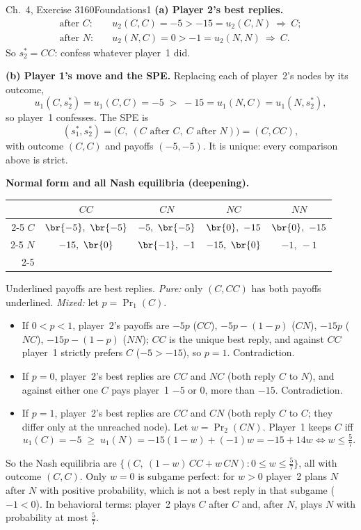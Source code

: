 \begin{exsol}{\MG{} Ch.~4, Exercise 3}{160}{Foundations}{1}
\textbf{(a) Player 2's best replies.}
\begin{align*}
  \text{after } C:&\quad u_2(C,C) = -5 > -15 = u_2(C,N) \ \Rightarrow\ C;\\
  \text{after } N:&\quad u_2(N,C) = 0 > -1 = u_2(N,N) \ \Rightarrow\ C .
\end{align*}
So $s_2^* = CC$: confess whatever player~1 did.

\textbf{(b) Player 1's move and the SPE.} Replacing each of player~2's nodes by its outcome,
\[
  u_1(C, s_2^*) = u_1(C,C) = -5 \;>\; -15 = u_1(N,C) = u_1(N, s_2^*),
\]
so player~1 confesses. The SPE is
\[
  (s_1^*, s_2^*) = \bigl(C,\ (C \text{ after } C,\ C \text{ after } N)\bigr) = (C, CC),
\]
with outcome $(C,C)$ and payoffs $(-5,-5)$. It is unique: every comparison above is strict.

\textbf{Normal form and all Nash equilibria (deepening).}
\begin{center}
\begin{tabular}{r|c|c|c|c|}
\multicolumn{1}{r}{} & \multicolumn{1}{c}{$CC$} & \multicolumn{1}{c}{$CN$} &
\multicolumn{1}{c}{$NC$} & \multicolumn{1}{c}{$NN$}\\ \cline{2-5}
$C$ & $\br{-5},\ \br{-5}$ & $-5,\ \br{-5}$ & $\br{0},\ -15$ & $\br{0},\ -15$ \\ \cline{2-5}
$N$ & $-15,\ \br{0}$ & $\br{-1},\ -1$ & $-15,\ \br{0}$ & $-1,\ -1$ \\ \cline{2-5}
\end{tabular}
\end{center}
Underlined payoffs are best replies. \emph{Pure:} only $(C, CC)$ has both payoffs underlined.
\emph{Mixed:} let $p = \Pr_1(C)$.
\begin{itemize}
  \item If $0 < p < 1$, player~2's payoffs are $-5p$ ($CC$), $-5p - (1-p)$ ($CN$), $-15p$ ($NC$),
  $-15p - (1-p)$ ($NN$); $CC$ is the unique best reply, and against $CC$ player~1 strictly prefers
  $C$ ($-5 > -15$), so $p = 1$. Contradiction.
  \item If $p = 0$, player~2's best replies are $CC$ and $NC$ (both reply $C$ to $N$), and against
  either one $C$ pays player~1 $-5$ or $0$, more than $-15$. Contradiction.
  \item If $p = 1$, player~2's best replies are $CC$ and $CN$ (both reply $C$ to $C$; they differ only
  at the unreached node). Let $w = \Pr_2(CN)$. Player~1 keeps $C$ iff
  \[
    u_1(C) = -5 \;\ge\; u_1(N) = -15(1-w) + (-1)w = -15 + 14w \iff w \le \tfrac{5}{7}.
  \]
\end{itemize}
So the Nash equilibria are $\{(C,\ (1-w)\,CC + w\,CN) : 0 \le w \le \frac57\}$, all with outcome
$(C,C)$. Only $w = 0$ is subgame perfect: for $w > 0$ player~2 plans $N$ after $N$ with positive
probability, which is not a best reply in that subgame ($-1 < 0$). In behavioral terms: player~2
plays $C$ after $C$ and, after $N$, plays $N$ with probability at most $\frac57$.


\end{exsol}
